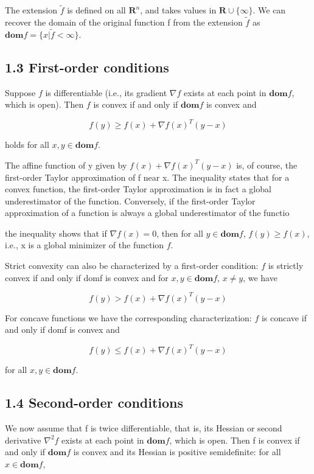 \documentclass{article}
\begin{document}
The extension $\widetilde{f}$ is defined on all $\mathbf{R}^n$, and takes values in $\mathbf{R} \cup \{\infty\}$. We can recover
the domain of the original function f from the extension $\widetilde{f}$  as $\mathbf{dom}f =\{x|\widetilde{f}<\infty\}$.

\subsection*{1.3 First-order conditions}

Suppose $f$ is differentiable (i.e., its gradient $\nabla f$ exists at each point in $\mathbf{dom}f$,
which is open). Then $f$ is convex if and only if $\mathbf{dom}f$ is convex and

\[
f(y)\ge f(x) +\nabla f(x)^T(y-x)    
\]

holds for all $x,y\in\mathbf{dom}f$.

The affine function of y given by $f(x) +\nabla f(x)^T(y-x)$ is, of course, the first-order
Taylor approximation of f near x. The inequality states that for a convex
function, the first-order Taylor approximation is in fact a global underestimator of
the function. Conversely, if the first-order Taylor approximation of a function is
always a global underestimator of the functio

the inequality shows
that if $\nabla f(x) = 0$, then for all $y\in\mathbf{dom}f$, $f(y) \ge f(x)$, i.e., x is a global minimizer
of the function $f$.

Strict convexity can also be characterized by a first-order condition: $f$ is strictly
convex if and only if domf is convex and for $x,y\in\mathbf{dom}f$, $x \ne y$, we have

\[
f(y)> f(x) +\nabla f(x)^T(y-x)    
\]

For concave functions we have the corresponding characterization: $f$ is concave
if and only if domf is convex and

\[
f(y)\le f(x) +\nabla f(x)^T(y-x)    
\]

for all $x,y\in\mathbf{dom}f$.

\subsection*{1.4 Second-order conditions}

We now assume that f is twice differentiable, that is, its Hessian or second derivative
$\nabla^2f$ exists at each point in $\mathbf{dom}f$, which is open. Then f is convex if and
only if $\mathbf{dom}f$ is convex and its Hessian is positive semidefinite: for all $x \in \mathbf{dom}f$,
\end{document}
